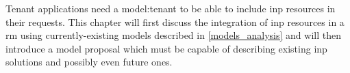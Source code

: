Tenant applications need a \gls{model:tenant} to be able to include \gls{inp} resources in their requests.
This chapter will first discuss the integration of \gls{inp} resources in a \gls{rm} using currently-existing models described in \autoref{models_analysis} and will then introduce a model proposal which must be capable of describing existing \gls{inp} solutions and possibly even future ones.